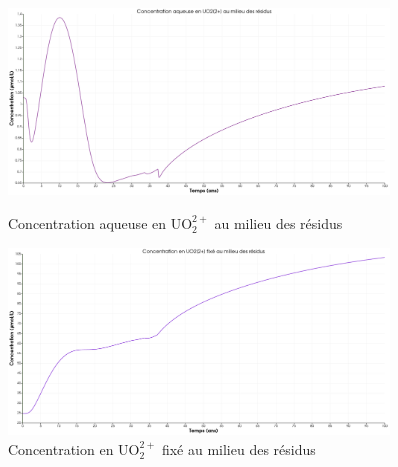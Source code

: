 \documentclass{article}
\begin{document}
\begin{figure}[H]
    \centering
    \begin{minipage}{0.5\textwidth}
        \centering
        \includegraphics[width=0.9\textwidth]{III_B_2_18.png} 
        \caption{Concentration aqueuse en UO$_2^{2+}$ au milieu des résidus}
        \label{fig:UO2_residus_Al}
    \end{minipage}\hfill
    \begin{minipage}{0.5\textwidth}
        \centering
        \includegraphics[width=0.9\textwidth]{III_B_2_19.png} 
        \caption{Concentration en UO$_2^{2+}$ fixé au milieu des résidus}
        \label{fig:UO2_fixe_residus_Al}
    \end{minipage}
\end{figure}
\end{document}
